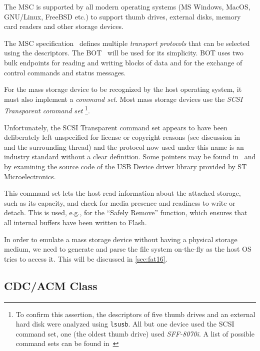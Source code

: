 The \gls{MSC} is supported by all modern operating systems (MS Windows, MacOS, GNU/Linux, FreeBSD etc.) to support thumb drives, external disks, memory card readers and other storage devices.


The \gls{MSC} specification~\cite{usbif-msco} defines multiple \textit{transport protocols} that can be selected using the descriptors. The \gls{BOT}~\cite{usbif-bot} will be used for its simplicity. \gls{BOT} uses two bulk endpoints for reading and writing blocks of data and for the exchange of control commands and status messages.

For the mass storage device to be recognized by the host operating system, it must also implement a \textit{command set}. Most mass storage devices use the \textit{\gls{SCSI} Transparent command set}
\footnote{To confirm this assertion, the descriptors of five thumb drives and an external hard disk were analyzed using \verb|lsusb|. All but one device used the SCSI command set, one (the oldest thumb drive) used \textit{SFF-8070i}. A list of possible command sets can be found in~\cite{usbif-msco}}.

Unfortunately, the \gls{SCSI} Transparent command set appears to have been deliberately left unspecified for license or copyright reasons (see discussion in~\cite{usb-tscsi-wtf} and the surrounding thread) and the protocol now used under this name is an industry standard without a clear definition. Some pointers may be found in~\cite{usb-tscsi} and by examining the source code of the USB Device driver library provided by ST Microelectronics.

This command set lets the host read information about the attached storage, such as its capacity, and check for media presence and readiness to write or detach. This is used, e.g., for the ``Safely Remove'' function, which ensures that all internal buffers have been written to Flash.

In order to emulate a mass storage device without having a physical storage medium, we need to generate and parse the file system on-the-fly as the host \gls{OS} tries to access it. This will be discussed in \cref{sec:fat16}.

\subsection{CDC/ACM Class} \label{sec:cdc-acm}

